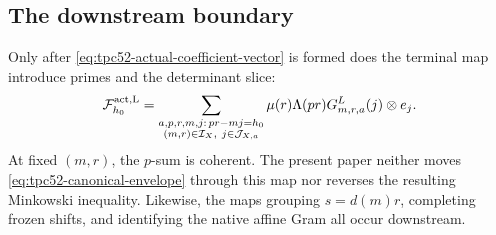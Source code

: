 \subsection{The downstream boundary}

Only after \eqref{eq:tpc52-actual-coefficient-vector} is formed does the
terminal map introduce primes and the determinant slice:
\begin{equation}
 \mathcal F_{h_0}^{\rm act,L}
 =\sum_{\substack{a,p,r,m,j:\,pr-mj=h_0\\
                    (m,r)\in\mathcal I_X,\ j\in\mathcal J_{X,a}}}
 \mu(r)\Lambda(pr)G_{m,r,a}^L(j)\otimes e_j.
 \label{eq:tpc52-downstream-prime-map}
\end{equation}
At fixed \((m,r)\), the \(p\)-sum is coherent.  The present paper neither
moves \eqref{eq:tpc52-canonical-envelope} through this map nor reverses
the resulting Minkowski inequality.  Likewise, the maps grouping
\(s=d(m)r\), completing frozen shifts, and identifying the native affine
Gram all occur downstream.
